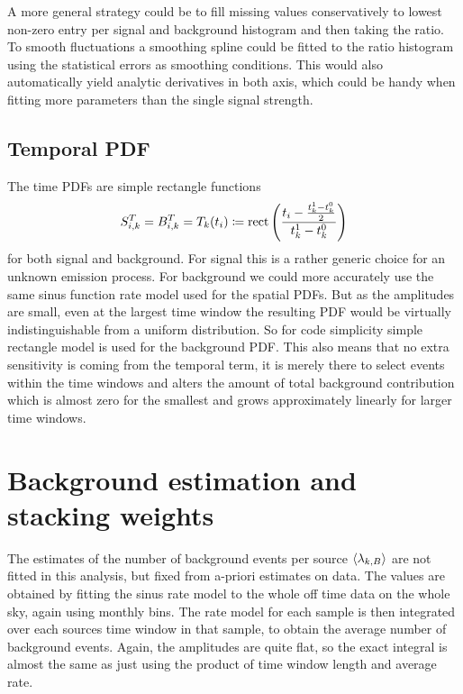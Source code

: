 A more general strategy could be to fill missing values conservatively to lowest non-zero entry per signal and background histogram and then taking the ratio.
To smooth fluctuations a smoothing spline could be fitted to the ratio histogram using the statistical errors as smoothing conditions.
This would also automatically yield analytic derivatives in both axis, which could be handy when fitting more parameters than the single signal strength.

\subsection*{Temporal PDF}
The time PDFs are simple rectangle functions
\begin{equation}
  S_{i,k}^T = B_{i,k}^T = T_k(t_i) \coloneqq
    \operatorname{rect}\left(\frac{t_i - \frac{t_k^1-t_k^0}{2}}
                              {t_k^1-t_k^0}\right)
\end{equation}
for both signal and background.
For signal this is a rather generic choice for an unknown emission process.
For background we could more accurately use the same sinus function rate model used for the spatial PDFs.
But as the amplitudes are small, even at the largest time window the resulting PDF would be virtually indistinguishable from a uniform distribution.
So for code simplicity simple rectangle model is used for the background PDF.
This also means that no extra sensitivity is coming from the temporal term, it is merely there to select events within the time windows and alters the amount of total background contribution which is almost zero for the smallest and grows approximately linearly for larger time windows.


\section{Background estimation and stacking weights}
The estimates of the number of background events per source $\Braket{\lambda_{k,B}}$ are not fitted in this analysis, but fixed from a-priori estimates on data.
The values are obtained by fitting the sinus rate model to the whole off time data on the whole sky, again using monthly bins.
The rate model for each sample is then integrated over each sources time window in that sample, to obtain the average number of background events.
Again, the amplitudes are quite flat, so the exact integral is almost the same as just using the product of time window length and average rate.

